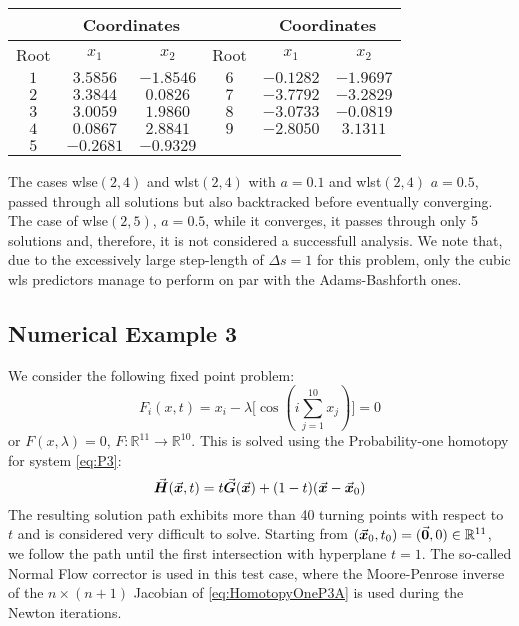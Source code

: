 \begin{table}[b]
	\centering
	\begin{minipage}{0.75\textwidth}
		\label{table:TABLE_CH5EX2_B}
		\small
		\renewcommand{\arraystretch}{1.25}
		\begin{tabular}{c c c c c c}
			\hline\hline
			& \multicolumn{2}{c}{Coordinates} & & 
			\multicolumn{2}{c}{Coordinates} \\
			\hline
			Root  & $x_1$ & $x_2$ &  Root  & $x_1$  & $x_2$ \\
			\hline
			$1$ & $3.5856$ & $-1.8546$ & $6$ & $-0.1282$ & $-1.9697$ \\
			$2$ & $3.3844$ & $0.0826$  & $7$ & $-3.7792$ & $-3.2829$ \\
			$3$ & $3.0059$ & $1.9860$  & $8$ & $-3.0733$ & $-0.0819$ \\
			$4$ & $0.0867$ & $2.8841$  & $9$ & $-2.8050$ & $3.1311$ \\
			$5$ & $-0.2681$ & $-0.9329$ &  &  &  \\
			\hline\hline
		\end{tabular}
	\end{minipage}
\end{table}
The cases \acrshort{wlse}$(2,4)$ and \acrshort{wlst}$(2,4)$ with $a=0.1$ and 
\acrshort{wlst}$(2,4)$ $a=0.5$,
passed through all solutions but also backtracked  before eventually converging.
The case of \acrshort{wlse}$(2,5)$, $a=0.5$, while it converges, it passes 
through only 5 
solutions and, therefore, it is not considered a successfull
analysis. We note that, due to the excessively large step-length of $\Delta
s=1$ for this problem, only the cubic \acrshort{wls} predictors manage to 
perform on par with the Adams-Bashforth ones. 

\subsection{Numerical Example 3}
We consider the following fixed point 
problem\cite{Watson79,Georg81,Schwetlick87}:
\begin{equation}
	F_i(x,t) = x_i-\lambda\bigl[\cos(i\sum_{j=1}^{10} x_j)\bigr]=0
	\label{eq:P3}
\end{equation}
or $F(x,\lambda)=0$, $F:\mathbb{R}^{11}\rightarrow\mathbb{R}^{10}$. This is 
solved using the Probability-one
homotopy\cite{Chow78,Watson:1990} for system \ref{eq:P3}:
\begin{equation}
	\vec{\bm{H}}(\vec{\bm{x}},t)=t \vec{\bm{G}}(\vec{\bm{x}})+(1-t)(\vec{\bm{x}}-\vec{\bm{x}}_0)
	\label{eq:HomotopyOneP3A}
\end{equation}
The resulting solution path exhibits more than 40 turning points with respect to
$t$ and is considered very difficult to solve. Starting from
$(\vec{\bm{x}}_0,t_0)=(\vec{\bm{0}},0)\in\mathbb{R}^{11}$, we follow the path until the
first intersection with hyperplane $t=1$. The so-called Normal Flow
corrector is used in this test case, where the Moore-Penrose inverse of the
$n\times(n+1)$ Jacobian of \ref{eq:HomotopyOneP3A} is used during the Newton 
iterations.

